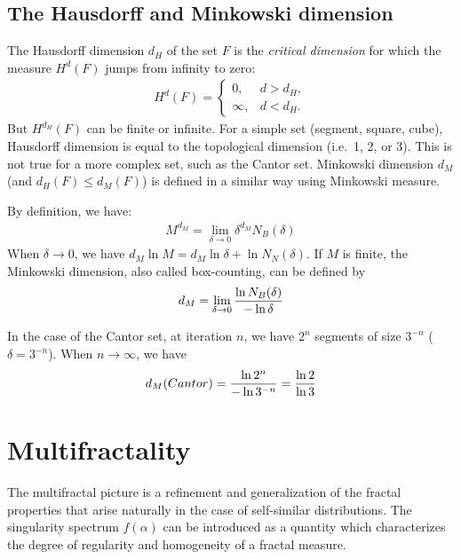 \subsection{The Hausdorff and Minkowski dimension}

The Hausdorff dimension $d_H$ of the set $F$ is the {\it
critical dimension} for which the measure $H^d(F)$ jumps from infinity
to zero:
\begin{eqnarray}
  H^d(F) =  \left\{ \begin{array}{ll}
                      0,      &  d > d_H, \\
                      \infty, &  d < d_H.
                   \end{array}
           \right.
 \label{eq-ch2-1}
\end{eqnarray}
But $H^{d_H}(F)$ can be finite or infinite. For a simple set 
(segment, square, cube),
Hausdorff dimension is equal to the topological dimension (i.e.\ 1, 2, 
or 3). This is not true for a more complex set, such as the Cantor set.
Minkowski dimension $d_M$ (and $d_H (F) \le d_M(F)$) is defined 
in a similar way using Minkowski measure.

By definition, we have:
\begin{eqnarray}
M^{d_M} = \lim_{\delta \rightarrow 0} \delta^{d_M} N_B(\delta)
\end{eqnarray}
When $\delta \rightarrow 0$, we have $d_M \ln M= d_M\ln{\delta} + \ln{N_N(\delta)}$. If
$M$ is finite, the Minkowski dimension, also called box-counting,
 can be defined by
\begin{eqnarray}
 d_M = \lim_{\delta \rightarrow 0} {\ln{N_B(\delta)} \over - \ln{\delta}}
\end{eqnarray}

In the case of the Cantor set, at iteration $n$, we have $2^n$ segments
of size $3^{-n}$ ($\delta = 3^{-n}$).  When $n  \rightarrow  \infty$, we have
\begin{eqnarray}
d_M (Cantor) = {\ln{2^n} \over {- \ln{3^{-n}}}}  = {\ln{2} \over \ln{3}}
\end{eqnarray}

\section{Multifractality}
The multifractal picture is a refinement and
generalization of the fractal properties
that arise naturally in the case of self-similar distributions.
The singularity spectrum $f(\alpha)$ can be introduced as a quantity
which characterizes the degree of regularity and homogeneity of a 
fractal measure.

